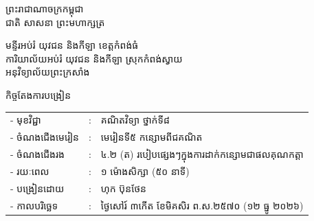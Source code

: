 \documentclass[a4paper,10pt]{article}
\newcommand{\khmflourish}{{\Tacteing\fontsize{36pt}{14pt}\selectfont\raisebox{-5pt}{3}}}
\begin{document}
\fontsize{10pt}{15.2pt}\selectfont

\begin{center}
  {\muol\fontsize{11pt}{16pt}\selectfont ព្រះរាជាណាចក្រកម្ពុជា}\\[2pt]
  {\muol\fontsize{10pt}{15pt}\selectfont ជាតិ សាសនា ព្រះមហាក្សត្រ}\\[1pt]
  \khmflourish
\end{center}

\vspace{-28pt}
{\muol\fontsize{9.5pt}{12.5pt}\selectfont
មន្ទីរអប់រំ យុវជន និងកីឡា ខេត្តកំពង់ធំ\\
ការិយាល័យអប់រំ យុវជន និងកីឡា ស្រុកកំពង់ស្វាយ\\
អនុវិទ្យាល័យព្រះក្រសាំង}

\vspace{1pt}
\begin{center}
  {\muol\fontsize{10pt}{14pt}\selectfont កិច្ចតែងការបង្រៀន}
\end{center}
\vspace{0pt}

{\renewcommand{\arraystretch}{0.95}
\hspace*{4.05cm}%
\begin{tabular}{@{}l l l@{}}
  - \hspace{0.35cm} មុខវិជ្ជា & : & គណិតវិទ្យា ថ្នាក់ទី៨ \\
  - \hspace{0.35cm} ចំណងជើងមេរៀន & : & មេរៀនទី៥ កន្សោមពីជគណិត \\
  - \hspace{0.35cm} ចំណងជើងរង & : & ៤.២ (ត) របៀបផ្សេងៗក្នុងការដាក់កន្សោមជាផលគុណកត្តា \\
  - \hspace{0.35cm} រយៈពេល & : & ១ ម៉ោងសិក្សា (៥០ នាទី) \\
  - \hspace{0.35cm} បង្រៀនដោយ & : & ហុក ប៊ុនថែន \\
  - \hspace{0.35cm} កាលបរិច្ឆេទ & : & ថ្ងៃសៅរ៍ ៣កើត ខែមិគសិរ ព.ស.២៥៧០ (១២ ធ្នូ ២០២៦) \\
\end{tabular}
}

\vspace{1pt}
\end{document}
